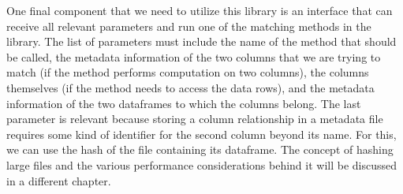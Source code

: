 One final component that we need to utilize this library is an interface that can receive all relevant parameters and run
one of the matching methods in the library.
The list of parameters must include the name of the method that should be called, the metadata information of the two columns
that we are trying to match (if the method performs computation on two columns), the columns themselves (if the method needs
to access the data rows), and the metadata information of the two dataframes to which the columns belong.
The last parameter is relevant because storing a column relationship in a metadata file requires some kind of identifier for
the second column beyond its name.
For this, we can use the hash of the file containing its dataframe.
The concept of hashing large files and the various performance considerations behind it will be discussed in a different chapter.
